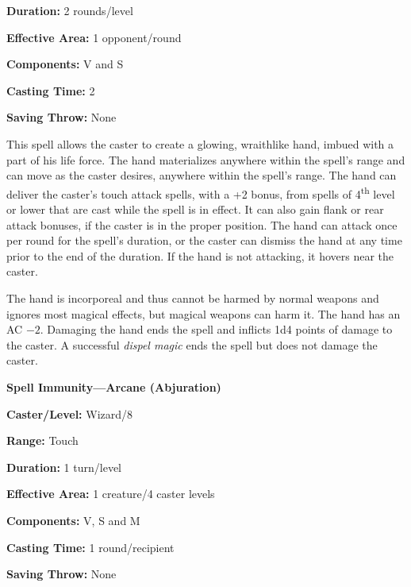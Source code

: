 \begin{multicols}{2}
\begin{minipage}{\columnwidth}
\noindent \textbf{Duration:} 2 rounds/level

\noindent \textbf{Effective Area:} 1 opponent/round

\noindent \textbf{Components:} V and S

\noindent \textbf{Casting Time:} 2

\noindent \textbf{Saving Throw:} None

\end{minipage}

This spell allows the caster to create a glowing, wraithlike hand, imbued with a part of his life force.  The hand materializes anywhere within the spell's range and can move as the caster desires, anywhere within the spell's range.  The hand can deliver the caster's touch attack spells, with a +2 bonus, from spells of 4\textsuperscript{th} level or lower that are cast while the spell is in effect.  It can also gain flank or rear attack bonuses, if the caster is in the proper position.  The hand can attack once per round for the spell's duration, or the caster can dismiss the hand at any time prior to the end of the duration.  If the hand is not attacking, it hovers near the caster.  

The hand is incorporeal and thus cannot be harmed by normal weapons and ignores most magical effects, but magical weapons can harm it.  The hand has an AC $-2$.  Damaging the hand ends the spell and inflicts 1d4 points of damage to the caster.  A successful \textit{dispel magic} ends the spell but does not damage the caster.
 
\vspace{1em}

\noindent
\begin{minipage}{\columnwidth}

\noindent \textbf{Spell Immunity---Arcane (Abjuration)}

\noindent \textbf{Caster/Level:} Wizard/8

\noindent \textbf{Range:} Touch

\noindent \textbf{Duration:} 1 turn/level

\noindent \textbf{Effective Area:} 1 creature/4 caster levels

\noindent \textbf{Components:} V, S and M

\noindent \textbf{Casting Time:} 1 round/recipient

\noindent \textbf{Saving Throw:} None

\end{minipage}


\end{multicols}
